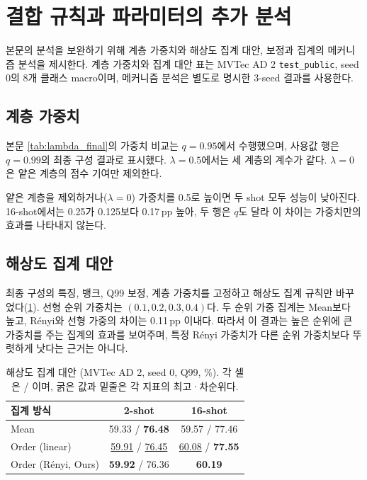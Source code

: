 \renewcommand{\floatpagefraction}{0.75}
\renewcommand{\dblfloatpagefraction}{0.75}
\section{결합 규칙과 파라미터의 추가 분석}
\label{sec:appendix:fusion}

본문의 분석을 보완하기 위해 계층 가중치와 해상도 집계 대안, 보정과 집계의 메커니즘 분석을 제시한다.
계층 가중치와 집계 대안 표는 MVTec AD 2 \texttt{test\_public}, seed 0의 8개 클래스 macro이며, 메커니즘 분석은 별도로 명시한 3-seed 결과를 사용한다.

\subsection{계층 가중치}
본문 \cref{tab:lambda_final}의 가중치 비교는 $q=0.95$에서 수행했으며, 사용값 행은 $q=0.99$의 최종 구성 결과로 표시했다.
$\lambda=0.5$에서는 세 계층의 계수가 같다. $\lambda=0$은 얕은 계층의 점수 기여만 제외한다.

얕은 계층을 제외하거나($\lambda=0$) 가중치를 0.5로 높이면 두 shot 모두 성능이 낮아진다. 16-shot에서는 0.25가 0.125보다 0.17\,pp 높아, 두 행은 $q$도 달라 이 차이는 가중치만의 효과를 나타내지 않는다.

\subsection{해상도 집계 대안}
\label{sec:appendix:aggregation}
최종 구성의 특징, 뱅크, Q99 보정, 계층 가중치를 고정하고 해상도 집계 규칙만 바꾸었다(\cref{tab:aggregation_alternatives}).
선형 순위 가중치는 $(0.1, 0.2, 0.3, 0.4)$다.
두 순위 가중 집계는 Mean보다  높고, Rényi와 선형 가중의 차이는 0.11\,pp 이내다.
따라서 이 결과는 높은 순위에 큰 가중치를 주는 집계의 효과를 보여주며, 특정 Rényi 가중치가 다른 순위 가중치보다 뚜렷하게 낫다는 근거는 아니다.

\begin{table}[!htbp]
\centering\scriptsize\setlength{\tabcolsep}{3pt}
\caption{해상도 집계 대안 (MVTec AD 2, seed 0, Q99, \%). 각 셀은 \AUPRO{} / \pAUROC{}이며, 굵은 값과 밑줄은 각 지표의 최고·차순위다.}
\label{tab:aggregation_alternatives}
\begin{tabular*}{\columnwidth}{@{\extracolsep{\fill}}lcc}
\toprule
집계 방식 & 2-shot & 16-shot \\
\midrule
Mean & 59.33 / \textbf{76.48} & 59.57 / 77.46 \\
Order (linear) & \underline{59.91} / \underline{76.45} & \underline{60.08} / \textbf{77.55} \\
Order (Rényi, Ours) & \textbf{59.92} / 76.36 & \textbf{60.19} \\
\bottomrule
\end{tabular*}
\end{table}

